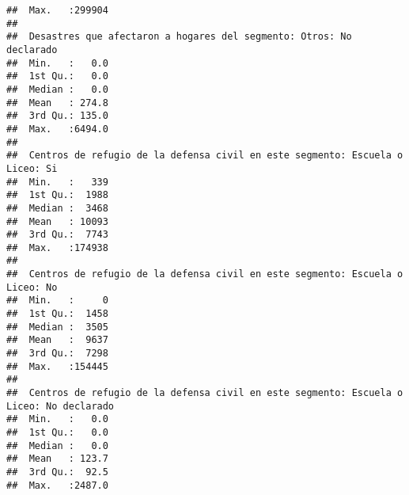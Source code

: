 \documentclass[11pt,]{article}
\begin{document}
\begin{verbatim}
##  Max.   :299904                                           
##                                                           
##  Desastres que afectaron a hogares del segmento: Otros: No declarado
##  Min.   :   0.0                                                     
##  1st Qu.:   0.0                                                     
##  Median :   0.0                                                     
##  Mean   : 274.8                                                     
##  3rd Qu.: 135.0                                                     
##  Max.   :6494.0                                                     
##                                                                     
##  Centros de refugio de la defensa civil en este segmento: Escuela o Liceo: Si
##  Min.   :   339                                                              
##  1st Qu.:  1988                                                              
##  Median :  3468                                                              
##  Mean   : 10093                                                              
##  3rd Qu.:  7743                                                              
##  Max.   :174938                                                              
##                                                                              
##  Centros de refugio de la defensa civil en este segmento: Escuela o Liceo: No
##  Min.   :     0                                                              
##  1st Qu.:  1458                                                              
##  Median :  3505                                                              
##  Mean   :  9637                                                              
##  3rd Qu.:  7298                                                              
##  Max.   :154445                                                              
##                                                                              
##  Centros de refugio de la defensa civil en este segmento: Escuela o Liceo: No declarado
##  Min.   :   0.0                                                                        
##  1st Qu.:   0.0                                                                        
##  Median :   0.0                                                                        
##  Mean   : 123.7                                                                        
##  3rd Qu.:  92.5                                                                        
##  Max.   :2487.0                                                                        

\end{verbatim}
\end{document}
